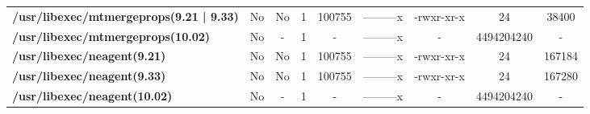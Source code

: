 \begin{center}
{\begin{tabular}{|>{\bfseries} l | C | C | C | C | C | C | C | C |}
					/usr/libexec/mtmergeprops(9.21 | 9.33) & No & No & \color{green}1 & \color{red}100755 & \color{green}---------x & \color{red}-rwxr-xr-x & \color{green}24 & \color{red}38400\\ 
					/usr/libexec/mtmergeprops(10.02) & No & - & 1 & - & ---------x & - & 4494204240 & -\\ 
					/usr/libexec/neagent(9.21) & No & No & \color{green}1 & \color{red}100755 & \color{green}---------x & \color{red}-rwxr-xr-x & \color{green}24 & \color{red}167184\\ 
					/usr/libexec/neagent(9.33) & No & No & \color{green}1 & \color{red}100755 & \color{green}---------x & \color{red}-rwxr-xr-x & \color{green}24 & \color{red}167280\\ 
					/usr/libexec/neagent(10.02) & No & - & 1 & - & ---------x & - & 4494204240 & -\\ 

			\end{tabular}
		}
	\end{center}


